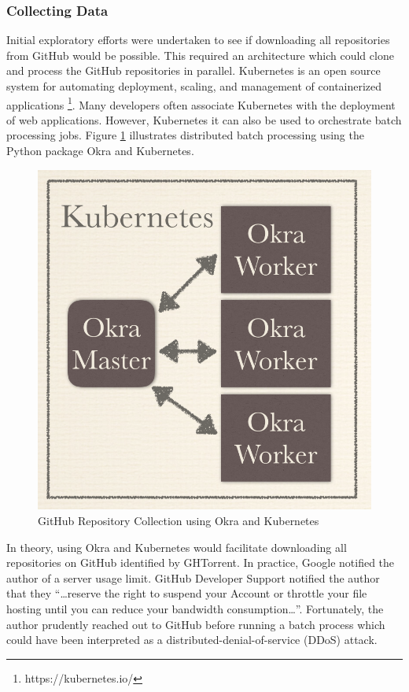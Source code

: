 \documentclass{article}
\begin{document}
\subsubsection{Collecting Data}

Initial exploratory efforts were undertaken to see if downloading all
repositories from GitHub would be possible. This required an architecture
which could clone and process the GitHub repositories in parallel.
Kubernetes is an open source system for automating deployment, scaling, and
management of containerized applications \footnote{https://kubernetes.io/}.
Many developers often associate Kubernetes with the deployment of web
applications. However, Kubernetes it can also be used to orchestrate batch
processing jobs. Figure \ref{fig:kubernetes} illustrates distributed batch
processing using the Python package Okra and Kubernetes.

\begin{figure}[h]
  \centering
  \includegraphics[scale=0.35]{kube_okra}
  \caption{GitHub Repository Collection using Okra and Kubernetes}
  \label{fig:kubernetes}
  \end{figure}

In theory, using Okra and Kubernetes would facilitate downloading all
repositories on GitHub identified by GHTorrent. In practice, Google notified
the author of a server usage limit. GitHub Developer Support notified
the author that they “…reserve the right to suspend your Account or throttle
your file hosting until you can reduce your bandwidth consumption…”.
Fortunately, the author prudently reached out to GitHub before running a
batch process which could have been interpreted as a
distributed-denial-of-service (DDoS) attack.
\end{document}
